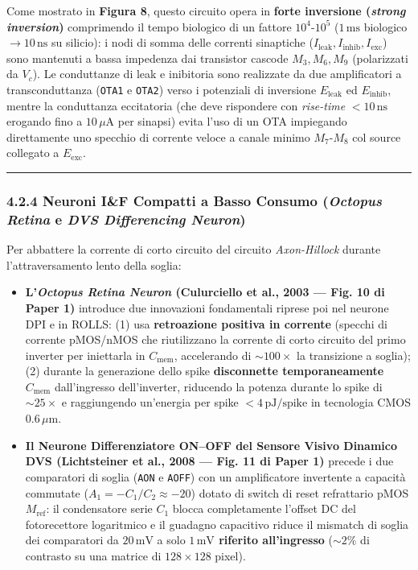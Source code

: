 \documentclass[11pt,a4paper]{article}
\begin{document}
Come mostrato in \textbf{Figura 8}, questo circuito opera in \textbf{forte inversione (\textit{strong inversion})} comprimendo il tempo biologico di un fattore \textbf{$10^4\text{-}10^5$} ($1\,\text{ms}$ biologico $\to 10\,\text{ns}$ su silicio): i nodi di somma delle correnti sinaptiche ($I_{\text{leak}}, I_{\text{inhib}}, I_{\text{exc}}$) sono mantenuti a bassa impedenza dai transistor cascode $M_3, M_6, M_9$ (polarizzati da $V_c$). Le conduttanze di leak e inibitoria sono realizzate da due amplificatori a transconduttanza (\texttt{OTA1} e \texttt{OTA2}) verso i potenziali di inversione $E_{\text{leak}}$ ed $E_{\text{inhib}}$, mentre la conduttanza eccitatoria (che deve rispondere con \textit{rise-time} $<10\,\text{ns}$ erogando fino a $10\,\mu\text{A}$ per sinapsi) evita l'uso di un OTA impiegando direttamente uno specchio di corrente veloce a canale minimo \textbf{$M_7\text{-}M_8$} col source collegato a $E_{\text{exc}}$.

\bigskip\hrule\bigskip

\subsubsection{4.2.4 Neuroni I\&F Compatti a Basso Consumo (\textit{Octopus Retina} e \textit{DVS Differencing Neuron})}

Per abbattere la corrente di corto circuito del circuito \textit{Axon-Hillock} durante l'attraversamento lento della soglia:
\begin{itemize}
  \item \textbf{L'\textit{Octopus Retina Neuron} (Culurciello et al., 2003 --- Fig. 10 di Paper 1)} introduce due innovazioni fondamentali riprese poi nel neurone DPI e in ROLLS: (1) usa \textbf{retroazione positiva in corrente} (specchi di corrente pMOS/nMOS che riutilizzano la corrente di corto circuito del primo inverter per iniettarla in $C_{\text{mem}}$, accelerando di $\sim 100\times$ la transizione a soglia); (2) durante la generazione dello spike \textbf{disconnette temporaneamente $C_{\text{mem}}$} dall'ingresso dell'inverter, riducendo la potenza durante lo spike di $\sim 25\times$ e raggiungendo un'energia per spike \textbf{$< 4\,\text{pJ/spike}$} in tecnologia CMOS $0.6\,\mu\text{m}$.
  \item \textbf{Il Neurone Differenziatore ON--OFF del Sensore Visivo Dinamico DVS (Lichtsteiner et al., 2008 --- Fig. 11 di Paper 1)} precede i due comparatori di soglia (\texttt{AON} e \texttt{AOFF}) con un amplificatore invertente a capacità commutate ($A_1 = -C_1/C_2 \approx -20$) dotato di switch di reset refrattario pMOS $M_{\text{ref}}$: il condensatore serie $C_1$ blocca completamente l'offset DC del fotorecettore logaritmico e il guadagno capacitivo riduce il mismatch di soglia dei comparatori da $20\,\text{mV}$ a solo \textbf{$1\,\text{mV}$ riferito all'ingresso} ($\sim 2\%$ di contrasto su una matrice di $128\times 128$ pixel).
\end{itemize}
\end{document}
